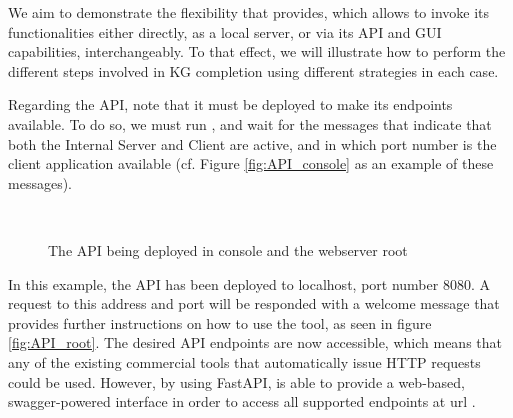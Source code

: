 We aim to demonstrate the flexibility that \toolname{} provides, which allows to invoke its functionalities either directly, as a local server, or via its API and GUI capabilities, interchangeably. To that effect, we will illustrate how to perform the different steps involved in KG completion using different strategies in each case.

Regarding the API, note that it must be deployed to make its endpoints available. To do so, we must run , and wait for the messages that indicate that both the Internal Server and Client are active, and in which port number is the client application available (cf. Figure \ref{fig:API_console} as an example of these messages).

\begin{figure}[!ht]
    \centering
    ~
    \\
    \caption{The API being deployed in console and the webserver root}
    \label{fig:API_base}
\end{figure}

In this example, the API has been deployed to localhost, port number 8080. A request to this address and port will be responded with a welcome message that provides further instructions on how to use the tool, as seen in figure \ref{fig:API_root}. The desired API endpoints are now accessible, which means that any of the existing commercial tools that automatically issue HTTP requests could be used. However, by using FastAPI, \toolname{} is able to provide a web-based, swagger-powered interface in order to access all supported endpoints at url .

